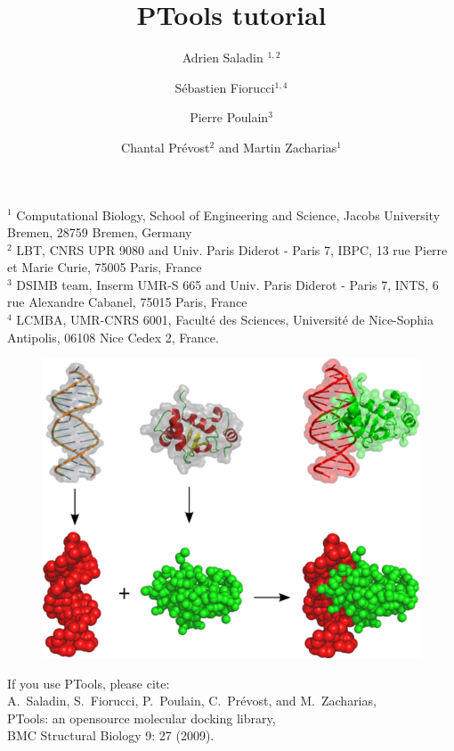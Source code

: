 \documentclass[12pt,a4paper]{article}
\begin{document}
\setlength{\parindent}{0pt}


\title{\bf PTools tutorial}

\author{Adrien Saladin $^{1,2}$
\and S\'ebastien Fiorucci$^{1,4}$
\and Pierre Poulain$^3$
\and Chantal Pr\'evost$^2$
 and Martin Zacharias$^1$
}

\maketitle
\thispagestyle{empty}

\noindent
{\scriptsize
$^1$ Computational Biology, School of Engineering and Science, Jacobs University Bremen, 28759 Bremen, Germany\\
$^2$ LBT, CNRS UPR 9080 and Univ. Paris Diderot - Paris 7, IBPC, 13 rue Pierre et Marie Curie, 75005 Paris, France   \\
$^3$ DSIMB team, Inserm UMR-S 665 and Univ. Paris Diderot - Paris 7, INTS,
6 rue Alexandre Cabanel, 75015 Paris, France   \\
$^4$ LCMBA, UMR-CNRS 6001, Facult\'e des Sciences, Universit\'e de Nice-Sophia Antipolis, 06108 Nice Cedex 2, France. \\
}

\vspace*{1cm}
\begin{figure}[htbp]
\center
\includegraphics*[width=0.80\linewidth]{img/docking.png}
\end{figure}

\vspace*{1cm}
If you use PTools, please cite: \\
A.~Saladin, S.~Fiorucci, P.~Poulain, C.~Pr\'evost, and M.~Zacharias,\\
PTools: an opensource molecular docking library,\\
BMC Structural Biology 9: 27 (2009).
\end{document}
